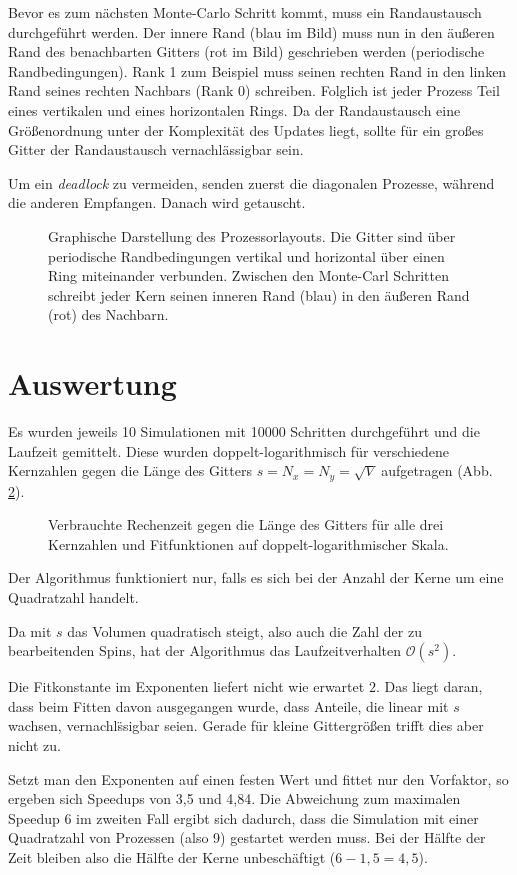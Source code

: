 \documentclass[headsepline=3pt,headinclude=true,14pt]{scrartcl}
\begin{document}
\begin{onehalfspace}
Bevor es zum nächsten Monte-Carlo Schritt kommt, muss ein Randaustausch durchgeführt werden. Der innere Rand (blau im Bild) muss nun in den äußeren Rand des benachbarten Gitters (rot im Bild) geschrieben werden (periodische Randbedingungen). Rank 1 zum Beispiel muss seinen rechten Rand in den linken Rand seines rechten Nachbars (Rank 0) schreiben. Folglich ist jeder Prozess Teil eines vertikalen und eines horizontalen Rings. Da der Randaustausch eine Größenordnung unter der Komplexität des Updates liegt, sollte für ein großes Gitter der Randaustausch vernachlässigbar sein.

Um ein \textit{deadlock} zu vermeiden, senden zuerst die diagonalen Prozesse, während die anderen Empfangen. Danach wird getauscht.
\begin{figure}

\caption{Graphische Darstellung des Prozessorlayouts. Die Gitter sind über periodische Randbedingungen vertikal und horizontal über einen Ring miteinander verbunden. Zwischen den Monte-Carl Schritten schreibt jeder Kern seinen inneren Rand (blau) in den äußeren Rand (rot) des Nachbarn.}
\label{ranks}
\end{figure}

\newpage
\section{Auswertung}
Es wurden jeweils 10 Simulationen mit 10000 Schritten durchgef\"uhrt und die Laufzeit gemittelt. Diese wurden doppelt-logarithmisch f\"ur verschiedene Kernzahlen gegen die L\"ange des Gitters $s=N_x=N_y=\sqrt{V}$ aufgetragen (Abb. \ref{plot}).

\begin{figure}[h]
\scalebox{1.1}{%

}
\caption{Verbrauchte Rechenzeit gegen die L\"ange des Gitters f\"ur alle drei Kernzahlen und Fitfunktionen auf doppelt-logarithmischer Skala.}
\label{plot}
\end{figure}

Der Algorithmus funktioniert nur, falls es sich bei der Anzahl der Kerne um eine Quadratzahl handelt.

Da mit $s$ das Volumen quadratisch steigt, also auch die Zahl der zu bearbeitenden Spins, hat der Algorithmus das Laufzeitverhalten $\mathcal{O}(s^2)$.

Die Fitkonstante im Exponenten liefert nicht wie erwartet $2$. Das liegt daran, dass beim Fitten davon ausgegangen wurde, dass Anteile, die linear mit $s$ wachsen, vernachl\"ssigbar seien. Gerade f\"ur kleine Gittergr\"o\ss en trifft dies aber nicht zu. 

Setzt man den Exponenten auf einen festen Wert und fittet nur den Vorfaktor, so ergeben sich Speedups von 3,5 und 4,84. Die Abweichung zum maximalen Speedup 6 im zweiten Fall ergibt sich dadurch, dass die Simulation mit einer Quadratzahl von Prozessen (also 9) gestartet werden muss. Bei der H\"alfte der Zeit bleiben also die H\"alfte der Kerne unbesch\"aftigt ($6 - 1,5 = 4,5$).

\end{onehalfspace}
\end{document}
